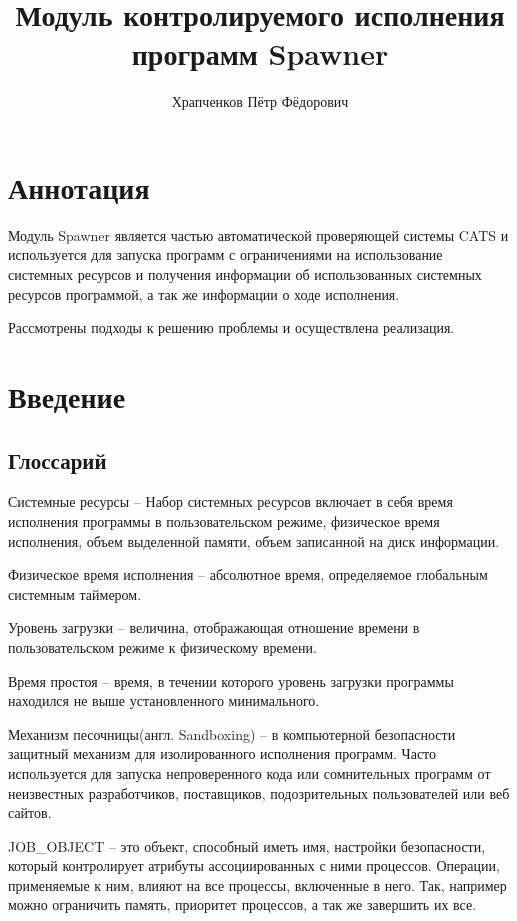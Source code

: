 \documentclass{imcs}
\title{Модуль контролируемого исполнения программ Spawner}
\author{Храпченков Пётр Фёдорович}
\begin{document}
\maketitle

\tableofcontents
\pagebreak

\section*{Аннотация}
Модуль Spawner является частью автоматической проверяющей системы CATS и используется для запуска программ с ограничениями на использование системных ресурсов и получения информации об использованных системных ресурсов программой, а так же информации о ходе исполнения.

Рассмотрены подходы к решению проблемы и осуществлена реализация.

\pagebreak

\section{Введение}
\subsection{Глоссарий}

Системные ресурсы -- Набор системных ресурсов включает в себя время исполнения программы в пользовательском режиме, физическое время исполнения, объем выделенной памяти, объем записанной на диск информации.

Физическое время исполнения -- абсолютное время, определяемое глобальным системным таймером.

Уровень загрузки -- величина, отображающая отношение времени в пользовательском режиме к физическому времени.

Время простоя -- время, в течении которого уровень загрузки программы находился не выше установленного минимального.

Механизм песочницы(англ. Sandboxing) -- в компьютерной безопасности защитный механизм для изолированного исполнения программ. Часто используется для запуска непроверенного кода или сомнительных программ от неизвестных разработчиков, поставщиков, подозрительных пользователей или веб сайтов.

JOB\_OBJECT -- это объект, способный иметь имя, настройки безопасности, который контролирует атрибуты ассоциированных с ними процессов. Операции, применяемые к ним, влияют на все процессы, включенные в него. Так, например можно ограничить память, приоритет процессов, а так же завершить их все.
\end{document}
